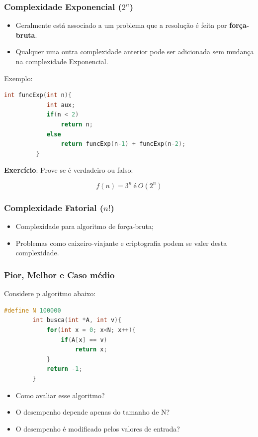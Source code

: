 \documentclass[10pt]{beamer}
\begin{document}
\begin{frame}[fragile, t]
    \frametitle{Complexidade Exponencial ($2^n$)}
    \begin{itemize}
        \item Geralmente está associado a um problema que a resolução é feita por \textbf{força-bruta}.
        \item Qualquer uma outra complexidade anterior pode ser adicionada sem mudança na complexidade Exponencial.
    \end{itemize}
    \pause Exemplo:
    \begin{lstlisting}[language=C++, basicstyle=\small]
        int funcExp(int n){
            int aux;
            if(n < 2)
                return n;
            else
                return funcExp(n-1) + funcExp(n-2);
         }
    \end{lstlisting}

    \pause\textbf{Exercício}: Prove se é verdadeiro ou falso:

    $$f(n) = 3^n\ \text{é}\ O(2^n)$$

\end{frame}

\begin{frame}[fragile, t]
    \frametitle{Complexidade Fatorial ($n!$)}

    \begin{itemize}
        \item Complexidade para algoritmo de força-bruta;
        \item Problemas como caixeiro-viajante e criptografia podem se valer desta complexidade.
    \end{itemize}

\end{frame}
\begin{frame}[fragile,t]
    \frametitle{Pior, Melhor e Caso médio}

    Considere p algoritmo abaixo:

    \begin{lstlisting}[language=C++, basicstyle=\small]
        #define N 100000
        int busca(int *A, int v){
            for(int x = 0; x<N; x++){
                if(A[x] == v)
                    return x;
            }
            return -1;
        }
    \end{lstlisting}
    \vfill
    \begin{itemize}
        \item Como avaliar esse algoritmo?
        \item O desempenho depende apenas do tamanho de N?
        \item O desempenho é modificado pelos valores de entrada?
    \end{itemize}
\end{frame}
\end{document}
